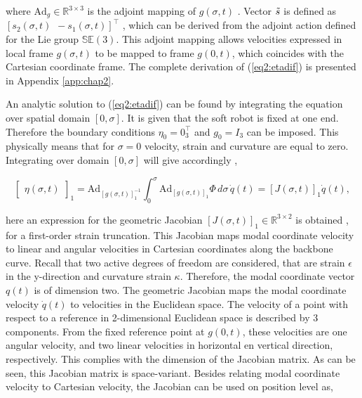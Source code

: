 where $\text{Ad}_g \in \mathbb{R}^{3 \times 3}$ \cite{2DLie} is the adjoint mapping of $g(\sigma,t)$ \cite{Sola2018}. Vector $\Tilde{s}$ is defined as $[s_2(\sigma,t) \hspace{5pt} -s_1(\sigma,t)]^\top$ \cite{2DLie}, which can be derived from the adjoint action defined for the Lie group $\mathbb{SE}(3)$. This adjoint mapping allows velocities expressed in local frame $g(\sigma,t)$ to be mapped to frame $g(0,t)$, which coincides with the Cartesian coordinate frame. The complete derivation of (\ref{eq2:etadif}) is presented in Appendix \ref{app:chap2}. 

An analytic solution to (\ref{eq2:etadif}) can be found by integrating the equation over spatial domain $[0,\sigma]$. It is given that the soft robot is fixed at one end. Therefore the boundary conditions $\eta_0 = 0_{3}^\top$ and $g_0 = I_{3}$ can be imposed. This physically means that for $\sigma = 0$ velocity, strain and curvature are equal to zero. Integrating over domain $[0,\sigma]$ will give accordingly  \textcolor{blue}{\cite{Caasenbrood2020}},

\begin{equation}
  \begin{bmatrix} \eta(\sigma,t)\end{bmatrix}_1 = \text{Ad}_{[g(\sigma,t)]_1^{-1}} \int_0^{\sigma} \text{Ad}_{[g(\sigma,t)]_1} \Phi \hspace{2pt} d \sigma  \hspace{2pt} \dot{q}(t) = [J(\sigma,t)]_1\dot{q}(t),
    \label{eq2:J}
\end{equation}

here an expression for the geometric Jacobian $[J(\sigma,t)]_1 \in \mathbb{R}^{3\times 2}$ is obtained \cite{Caasenbrood2020}, for a first-order strain truncation. This Jacobian maps modal coordinate velocity to linear and angular velocities in Cartesian coordinates along the backbone curve. Recall that two active degrees of freedom are considered, that are strain $\epsilon$ in the y-direction and curvature strain $\kappa$. Therefore, the modal coordinate vector $q(t)$ is of dimension two. The geometric Jacobian maps the modal coordinate velocity $\dot{q}(t)$ to velocities in the Euclidean space. The velocity of a point with respect to a reference in 2-dimensional Euclidean space is described by 3 components. From the fixed reference point at $g(0,t)$, these velocities are one angular velocity, and two linear velocities in horizontal en vertical direction, respectively. This complies with the dimension of the Jacobian matrix. As can be seen, this Jacobian matrix is space-variant. Besides relating modal coordinate velocity to Cartesian velocity, the Jacobian can be used on position level as,

